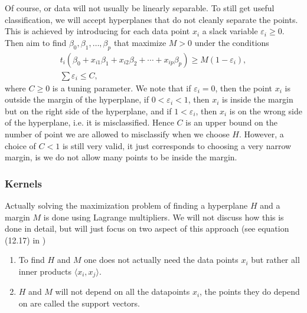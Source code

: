 \documentclass[parskip=half]{scrartcl}
\theoremstyle{definition}
\theoremstyle{remark}
\begin{document}
Of course, or data will not usually be linearly separable. 
To still get useful classification, we will accept hyperplanes that do not cleanly separate the points. 
This is achieved by introducing for each data point $x_i$ a slack variable $\varepsilon_i \geq 0$. 
Then aim to find $\beta_0, \beta_1, \ldots, \beta_p$ that maximize $M > 0$ under the conditions 
\begin{gather*}
	t_i(\beta_0 + x_{i1} \beta_1 + x_{i2} \beta_2 + \cdots + x_{ip} \beta_p) \geq M(1-\varepsilon_i), \\
	\sum \varepsilon_i \leq C,	
\end{gather*} 
where $C \geq 0$ is a tuning parameter.
We note that if $\varepsilon_i = 0$, then the point $x_i$ is outside the margin of the hyperplane, if $0 < \varepsilon_i < 1$, then $x_i$ is inside the margin but on the right side of the hyperplane, and if $1 < \varepsilon_i$, then $x_i$ is on the wrong side of the hyperplane, i.e. it is misclassified.  
Hence $C$ is an upper bound on the number of point we are allowed to misclassify when we choose $H$.
However, a choice of $C < 1$ is still very valid, it just corresponds to choosing a very narrow margin, is we do not allow many points to be inside the margin.    

\subsubsection{Kernels} \label{sssec:kernels}
 
Actually solving the maximization problem of finding a hyperplane $H$ and a margin $M$ is done using Lagrange multipliers. 
We will not discuss how this is done in detail, but will just focus on two aspect of this approach (see equation (12.17) in \cite{htf:esl})
\begin{enumerate}
	\item To find $H$ and $M$ one does not actually need the data points $x_i$ but rather all inner products $\langle x_i, x_j \rangle$. 
	\item $H$ and $M$ will not depend on all the datapoints $x_i$, the points they do depend on are called the support vectors. 
\end{enumerate}
\end{document}
